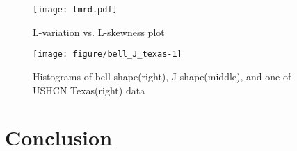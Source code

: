 \documentclass[12pt]{article}\usepackage[]{graphicx}\usepackage[]{color}
\makeatletter
\def\maxwidth{ %
  \ifdim\Gin@nat@width>\linewidth
    \linewidth
  \else
    \Gin@nat@width
  \fi
}
\makeatother
\begin{document}
\begin{figure}
  \centering
  \texttt{[image: lmrd.pdf]}
  \caption{L-variation vs. L-skewness plot}
\end{figure}


\begin{figure}
\texttt{[image: figure/bell\_J\_texas-1]} \caption[Histograms of bell-shape(right), J-shape(middle), and one of USHCN Texas(right) data]{Histograms of bell-shape(right), J-shape(middle), and one of USHCN Texas(right) data}\label{fig:bell J texas}
\end{figure}





\section{Conclusion}




\end{document}
